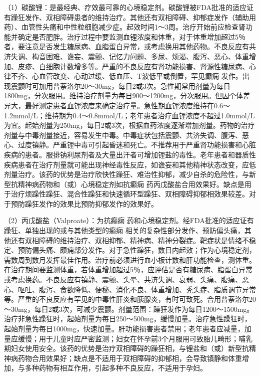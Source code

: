 （1）碳酸锂：是最经典、疗效最可靠的心境稳定剂。碳酸锂被FDA批准的适应证有躁狂发作、双相障碍患者的维持治疗。其他还有双相障碍、抑郁症发作（辅助用药）、血管性头痛和中性粒细胞减少症。起效时间1～3周。治疗开始前应检查肾功能并确定是否肥胖。治疗过程中要监测血锂浓度和体重，对于体重增加超过5％者，要注意是否发生糖尿病、血脂蛋白异常，或考虑换用其他药物。不良反应有共济失调、构音困难、谵妄、震颤、记忆力问题、多尿、烦渴、腹泻、恶心、体重增加、皮疹、白细胞计数增多等。严重的不良反应有肾功能损害、肾源性糖尿病、心律不齐、心血管改变、心动过缓、低血压、T波低平或倒置，罕见癫痫
发作。出现震颤时可加用普萘洛尔20～30mg，每日2或3次。急性期常用剂量为每日1800mg，分次服用。维持治疗剂量为每日900～1200mg，分次服用。但因个体差异大，最好测定患者血锂浓度来确定治疗量。急性期血锂浓度维持在0.6～1.2mmol/L；维持期为0.4～0.8mmol/L；老年患者治疗血锂浓度不超过1.0mmol/L为宜。起始剂量为250mg，每日2或3次，根据血药浓度逐渐增加剂量。药物的治疗剂量与中毒剂量接近，容易发生中毒。中毒症状包括震颤、共济失调、腹泻、恶心、过度镇静。严重锂中毒可引起昏迷和死亡。不推荐用于严重肾功能损害和心脏疾病的患者。服排钠利尿剂者及大量出汗者可增加锂盐的毒性。老年患者和器质性疾病患者在治疗剂量就可能出现神经毒性反应，如谵妄和其他精神状态改变，应低剂量治疗。该药的优势是治疗欣快性躁狂、难治性抑郁，减少自杀的危险性，与新型抗精神病药物和（或）心境稳定剂如抗癫痫
药丙戊酸盐合用效果好。缺点是用于治疗烦躁性躁狂、混合性躁狂和快速循环型躁狂、双相障碍抑郁相效果较差。对于预防躁狂发作的效果比预防抑郁发作的效果好。

（2）丙戊酸盐（Valproate）：为抗癫痫
药和心境稳定剂。经FDA批准的适应证有躁狂、单独出现的或与其他类型的癫痫
相关的复杂性部分发作、预防偏头痛，其他还有双相障碍的维持治疗、双相抑郁、精神病、精神分裂症。靶症状是情绪不稳定、预防偏头痛、颇痈部分发作。对于急性躁狂，数日内起效；作为心境稳定剂，需数周到数月发挥最佳作用。治疗前必须进行血小板计数和肝功能检查，测体重。在治疗期间要监测体重，若体重增加超过5％，应评估是否有糖尿病、脂蛋白异常或考虑换药。不良反应有镇静、震颤、头晕、共济失调、衰弱、头痛、腹痛、恶心、呕吐、腹泻、食欲降低、便秘、消化不良、体重增加、秃头症、脂质调节异常等。严重的不良反应有罕见的中毒性肝炎和胰腺炎，有时可致死。合用普萘洛尔20～30mg，每日2或3次，可减少震颤。剂量范围：躁狂发作为每日1200～1500mg。治疗非急性躁狂时，起始剂量为每日250～500mg，缓慢加量。治疗急性躁狂时，起始剂量为每日1000mg，快速加量。肝功能损害患者禁用；老年患者应减量，加量应缓慢；用于儿童时应严密监测；妇女在怀孕前3个月服用可致胎儿畸形；哺乳期妇女使用安全。该药的优势是治疗双相障碍的躁狂相，与锂盐和（或）新型抗精神病药物合用效果好；缺点是不适用于双相障碍的抑郁相，会导致镇静和体重增加，与多种药物有相互作用，引起多种不良反应，不适用于孕妇。

